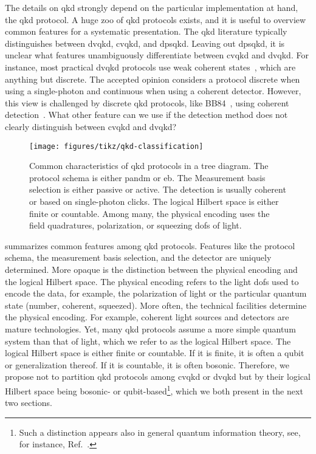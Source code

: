 The details on \gls{qkd} strongly depend on the particular implementation at hand, the \gls{qkd} protocol.
A huge zoo of \gls{qkd} protocols exists, and it is useful to overview common features for a systematic presentation.
The \gls{qkd} literature typically distinguishes between \gls{dvqkd}, \gls{cvqkd}, and \gls{dpsqkd}.
Leaving out \gls{dpsqkd}, it is unclear what features unambiguously differentiate between \gls{cvqkd} and \gls{dvqkd}.
For instance, most practical \gls{dvqkd} protocols use weak coherent states~\cite{Duvsek2006}, which are anything but discrete.
The accepted opinion considers a protocol discrete when using a single-photon and continuous when using a coherent detector.
However, this view is challenged by discrete \gls{qkd} protocols, like BB84~\cite{Bennett1984}, using coherent detection~\cite{Qi2021}.
What other feature can we use if the detection method does not clearly distinguish between \gls{cvqkd} and \gls{dvqkd}?
\begin{figure}[htb]
	\centering
	\texttt{[image: figures/tikz/qkd-classification]}
	\caption{Common characteristics of \gls{qkd} protocols in a tree diagram. The protocol schema is either \gls{pandm} or \gls{eb}. The Measurement basis selection is either passive or active. The detection is usually coherent or based on single-photon clicks. The logical Hilbert space is either finite or countable. Among many, the physical encoding uses the field quadratures, polarization, or squeezing \glspl{dof} of light.}\label{fig:qkd_classification}
\end{figure}
 summarizes common features among \gls{qkd} protocols.
Features like the protocol schema, the measurement basis selection, and the detector are uniquely determined.
More opaque is the distinction between the physical encoding and the logical Hilbert space.
The physical encoding refers to the light \glspl{dof} used to encode the data, for example, the polarization of light or the particular quantum state (number, coherent, squeezed).
More often, the technical facilities determine the physical encoding.
For example, coherent light sources and detectors are mature technologies.
Yet, many \gls{qkd} protocols assume a more simple quantum system than that of light, which we refer to as the logical Hilbert space.
The logical Hilbert space is either finite or countable.
If it is finite, it is often a qubit or generalization thereof.
If it is countable, it is often bosonic.
Therefore, we propose not to partition \gls{qkd} protocols among \gls{cvqkd} or \gls{dvqkd} but by their logical Hilbert space being bosonic- or qubit-based\footnote{Such a distinction appears also in general quantum information theory, see, for instance, Ref.~\cite[p.~2]{Weedbrook2012}.}, which we both present in the next two sections.